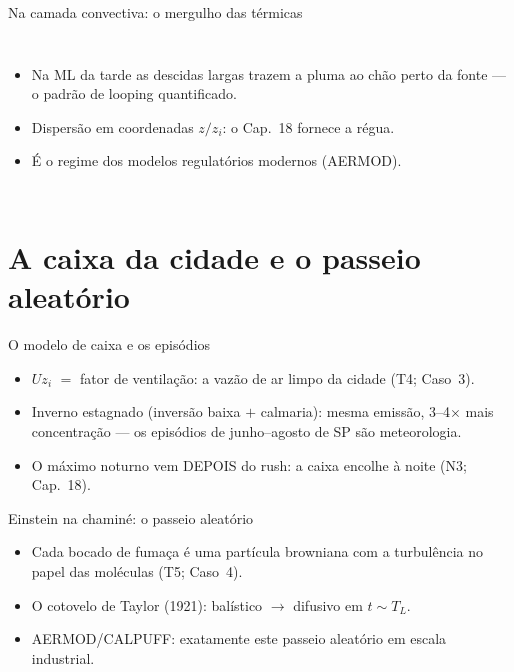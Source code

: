 \documentclass[aspectratio=169,11pt]{beamer}
\begin{document}
\begin{frame}{Na camada convectiva: o mergulho das térmicas}
  \begin{columns}
    \begin{itemize}
      \item Na ML da tarde as descidas largas trazem a pluma ao chão
            perto da fonte — o padrão de looping quantificado.
      \item Dispersão em coordenadas $z/z_i$: o Cap.~18 fornece a
            régua.
      \item É o regime dos modelos regulatórios modernos (AERMOD).
    \end{itemize}
  \end{columns}
\end{frame}

\section{A caixa da cidade e o passeio aleatório}

\begin{frame}{O modelo de caixa e os episódios}
  \vspace{0.5em}
  \begin{itemize}
    \item $Uz_i$ $=$ \alert{fator de ventilação}: a vazão de ar limpo
          da cidade (T4; Caso~3).
    \item Inverno estagnado (inversão baixa $+$ calmaria): mesma
          emissão, 3--4$\times$ mais concentração — os episódios de
          junho--agosto de SP são meteorologia.
    \item O máximo noturno vem DEPOIS do rush: a caixa encolhe à
          noite (N3; Cap.~18).
  \end{itemize}
\end{frame}

\begin{frame}{Einstein na chaminé: o passeio aleatório}
  \vspace{0.5em}
  \begin{itemize}
    \item Cada bocado de fumaça é uma partícula browniana com a
          turbulência no papel das moléculas (T5; Caso~4).
    \item O cotovelo de Taylor (1921): balístico $\to$ difusivo em
          $t \sim T_L$.
    \item AERMOD/CALPUFF: exatamente este passeio aleatório em escala
          industrial.
  \end{itemize}
\end{frame}
\end{document}
